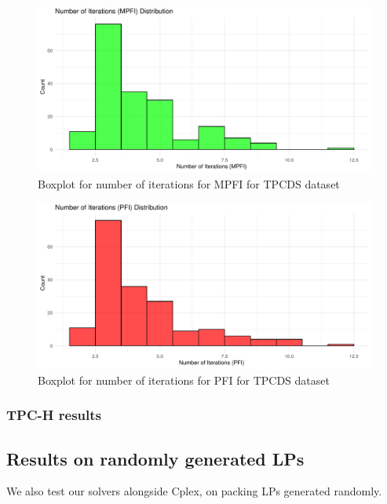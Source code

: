 \begin{figure}[!htb]
    \centering
    \includegraphics[width=\linewidth]{figures/num_iter_tpcds_mpfi.pdf}
    \caption{Boxplot for number of iterations for MPFI for TPCDS dataset}
    \label{fig:num_iter_tpcds_mpfi}
\end{figure}

\begin{figure}[!htb]
    \centering
    \includegraphics[width=\linewidth]{figures/num_iter_pfi_tpcds.pdf}
    \caption{Boxplot for number of iterations for PFI for TPCDS dataset}
    \label{fig:num_iter_pfi_tpcds}
\end{figure}


\subsubsection{TPC-H results}


\subsection{Results on randomly generated LPs}
We also test our solvers alongside Cplex, on packing LPs generated randomly.

